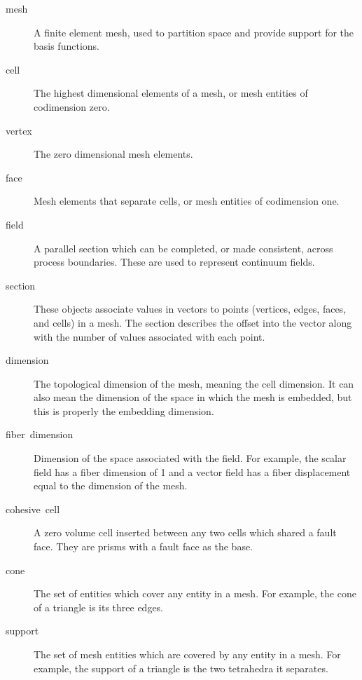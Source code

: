\begin{description}
\item [mesh] A finite element mesh, used to partition space and
  provide support for the basis functions.
\item [cell] The highest dimensional elements of a mesh, or mesh
  entities of codimension zero.
\item [vertex] The zero dimensional mesh elements.
\item [face] Mesh elements that separate cells, or mesh entities of
  codimension one.
\item [field] A parallel section which can be completed, or made
  consistent, across process boundaries. These are used to represent
  continuum fields.
\item [section] These objects associate values in vectors to points
  (vertices, edges, faces, and cells) in a mesh. The section describes
  the offset into the vector along with the number of values
  associated with each point.
\item [dimension] The topological dimension of the mesh, meaning the
  cell dimension. It can also mean the dimension of the space in which
  the mesh is embedded, but this is properly the embedding dimension.
\item [fiber\ dimension] Dimension of the space associated with the
  field. For example, the scalar field has a fiber dimension of 1 and
  a vector field has a fiber displacement equal to the dimension of
  the mesh.
\item [cohesive\ cell] A zero volume cell inserted between any two
  cells which shared a fault face. They are prisms with a fault face
  as the base.
\item [cone] The set of entities which cover any entity in a mesh. For
  example, the cone of a triangle is its three edges.
\item [support] The set of mesh entities which are covered by any
  entity in a mesh. For example, the support of a triangle is the two
  tetrahedra it separates.
\end{description}

